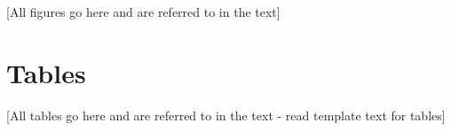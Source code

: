 \documentclass[english]{article}
\begin{document}

[All figures go here and are referred to in the text]

\section*{Tables}




[All tables go here and are referred to in the text - read template text for tables]
\end{document}

